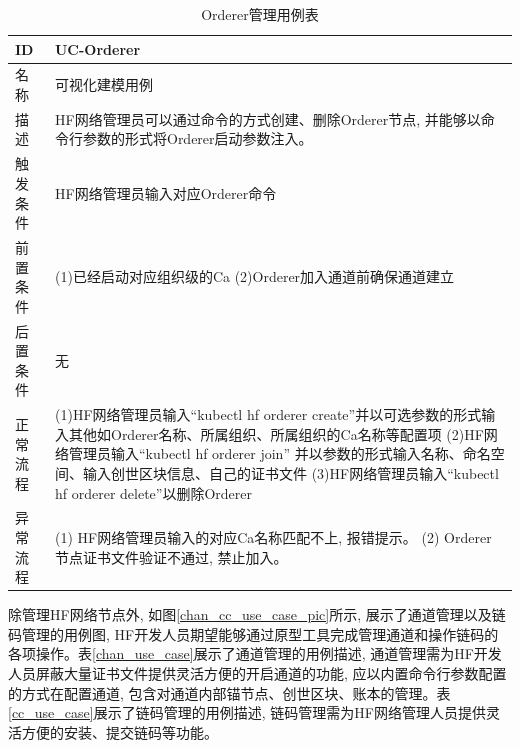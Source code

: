 {\footnotesize
\begin{longtable}[h]{m{60pt}|m{280pt}}
    \caption[Orderer管理用例表]{Orderer管理用例表} \label{orderer_use_case} \\
        \hline  
        ID&UC-Orderer\\
        \hline
        名称&可视化建模用例\\
        \hline
        描述&HF网络管理员可以通过命令的方式创建、删除Orderer节点, 并能够以命令行参数的形式将Orderer启动参数注入。\\
        \hline
        触发条件&HF网络管理员输入对应Orderer命令\\
        \hline
        前置条件& (1)已经启动对应组织级的Ca
        \newline (2)Orderer加入通道前确保通道建立\\
        \hline
        后置条件&无\\
        \hline
        正常流程& (1)HF网络管理员输入“kubectl hf orderer create”并以可选参数的形式输入其他如Orderer名称、所属组织、所属组织的Ca名称等配置项
        \newline (2)HF网络管理员输入“kubectl hf orderer join” 并以参数的形式输入名称、命名空间、输入创世区块信息、自己的证书文件
        \newline (3)HF网络管理员输入“kubectl hf orderer delete”以删除Orderer \\
        \hline 
        异常流程& (1) HF网络管理员输入的对应Ca名称匹配不上, 报错提示。
        \newline (2) Orderer节点证书文件验证不通过, 禁止加入。 \\
        \hline
    \end{longtable} 
}

除管理HF网络节点外, 如图\ref{chan_cc_use_case_pic}所示, 展示了通道管理以及链码管理的用例图, HF开发人员期望能够通过原型工具完成管理通道和操作链码的各项操作。表\ref{chan_use_case}展示了通道管理的用例描述, 通道管理需为HF开发人员屏蔽大量证书文件提供灵活方便的开启通道的功能, 应以内置命令行参数配置的方式在配置通道, 包含对通道内部锚节点、创世区块、账本的管理。表\ref{cc_use_case}展示了链码管理的用例描述, 链码管理需为HF网络管理人员提供灵活方便的安装、提交链码等功能。

